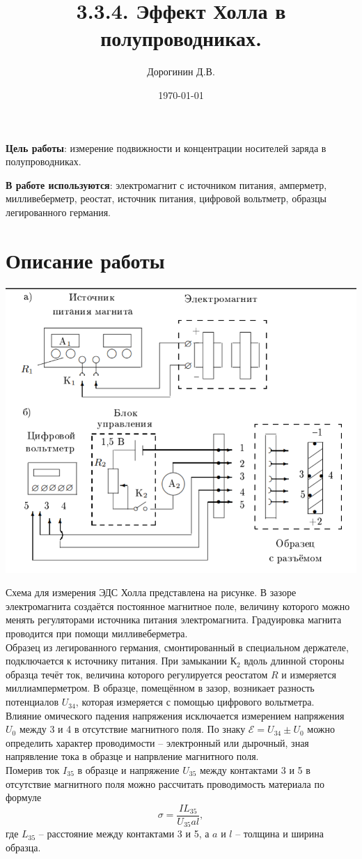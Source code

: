\documentclass[a4paper,12pt]{article}
\author{Дорогинин Д.В.}
\title{3.3.4. Эффект Холла в полупроводниках.}
\date{\today}
\begin{document}
\maketitle
\newpage
\textbf{Цель работы}: измерение подвижности и концентрации носителей заряда в полупроводниках.


\textbf{В работе используются}: электромагнит с источником питания, амперметр, милливеберметр, реостат, источник питания, цифровой вольтметр, образцы легированного германия.\\
\section*{Описание работы}
\begin{center}
\includegraphics[scale=0.5]{1.png}
\end{center}
Схема для измерения ЭДС Холла представлена на рисунке. В зазоре электромагнита создаётся постоянное магнитное поле, величину которого можно менять регуляторами источника питания электромагнита. Градуировка магнита проводится при помощи милливеберметра.\\
Образец из легированного германия, смонтированный в специальном держателе, подключается к источнику питания. При замыкании К$_2$ вдоль длинной стороны образца течёт ток, величина которого регулируется реостатом $R$ и измеряется миллиамперметром. В образце, помещённом в зазор, возникает разность потенциалов $U_{34}$, которая измеряется с помощью цифрового вольтметра.\\
Влияние омического падения напряжения исключается измерением напряжения $U_0$ между 3 и 4 в отсутствие магнитного поля. По знаку $\mathcal{E} = U_{34} \pm U_0$ можно определить характер проводимости -- электронный или дырочный, зная напрявление тока в образце и напрвление магнитного поля.\\
Померив ток $I_{35}$ в образце и напряжение $U_{35}$ между контактами 3 и 5 в отсутствие магнитного поля можно рассчитать проводимость материала по формуле
$$
\sigma = \frac{IL_{35}}{U_{35}al},
$$
где $L_{35}$ -- расстояние между контактами 3 и 5, а $a$ и $l$ -- толщина и ширина образца.
\end{document}

